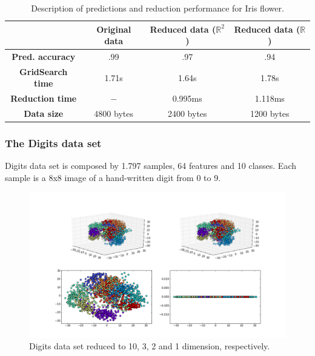 \documentclass[12pt]{article}
\begin{document}
\begin{table}[H]
	\centering

	\begin{tabular}{|c|c|c|c|}
		\hline
		& \textbf{Original data} & \textbf{Reduced data ($\mathbb{R}^2$)} & \textbf{Reduced data ($\mathbb{R}$)} \\\hline
		\textbf{Pred. accuracy} & .99 & .97 & .94 \\\hline
		\textbf{GridSearch time} & 1.71s & 1.64s & 1.78s \\\hline
		\textbf{Reduction time} & $-$ & 0.995ms & 1.118ms \\\hline
		\textbf{Data size} & 4800 bytes & 2400 bytes & 1200 bytes \\\hline
	\end{tabular}

	\caption{Description of predictions and reduction performance for Iris flower.}
\end{table}

\subsubsection{The Digits data set}

Digits data set is composed by 1.797 samples, 64 features and 10 classes. Each sample is a 8x8 image of a hand-written digit from 0 to 9.

\begin{figure}[H]
	\centering
	\captionsetup{justification=centering}
	\includegraphics[width=\linewidth]{dsdigitspca}
	\caption{Digits data set reduced to 10, 3, 2 and 1 dimension, respectively.}
	\label{fig:dsdigitspca}
\end{figure}
\end{document}
